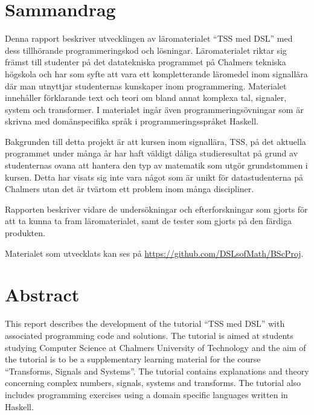 \documentclass[]{article}
\begin{document}
\section*{Sammandrag}
Denna rapport beskriver utvecklingen av läromaterialet ``TSS med DSL'' med dess
tillhörande programmeringskod och lösningar. Läromaterialet riktar sig främst
till studenter på det datatekniska programmet på Chalmers tekniska högskola och har som syfte att
vara ett kompletterande läromedel inom signallära där man utnyttjar studenternas
kunskaper inom programmering. Materialet innehåller förklarande text och teori
om bland annat komplexa tal, signaler, system och transformer. I materialet
ingår även programmeringsövningar som är skrivna med domänspecifika språk i
programmeringsspråket \gls{Haskell}.

Bakgrunden till detta projekt är att kursen inom signallära, TSS, på det
aktuella programmet under många år har haft väldigt dåliga studieresultat på
grund av studenternas ovana att hantera den typ av matematik som utgör
grundstommen i kursen. Detta har visats sig inte vara något som är unikt
för datastudenterna på Chalmers utan det är tvärtom ett problem inom många
discipliner.

Rapporten beskriver vidare de undersökningar och efterforskningar som gjorts
för att ta kunna ta fram läromaterialet, samt de tester som gjorts på den
färdiga produkten.

Materialet som utvecklats kan ses på \url{https://github.com/DSLsofMath/BScProj}.

\newpage
\section*{Abstract}
This report describes the development of the tutorial ``TSS med DSL'' with
associated programming code and solutions. The tutorial is aimed at students
studying Computer Science at Chalmers University of Technology and the aim of
the tutorial is to be a supplementary learning material for the course
``Transforms, Signals and Systems''. The tutorial contains explanations and
theory concerning complex numbers, signals, systems and transforms. The
tutorial also includes programming exercises using a domain specific languages
written in Haskell.
\end{document}
